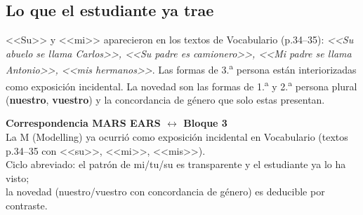 \documentclass[a4paper,10pt]{article}
\newcommand{\pos}[1]{\textbf{\textcolor{purpura}{#1}}}
\begin{document}

\subsection*{\textcolor{purpura}{Lo que el estudiante ya trae}}

<<Su>> y <<mi>> aparecieron en los textos de Vocabulario (p.34--35): \textit{<<Su abuelo se llama Carlos>>, <<Su padre es camionero>>, <<Mi padre se llama Antonio>>, <<mis hermanos>>}. Las formas de 3.\textsuperscript{a} persona est\'an interiorizadas como exposici\'on incidental. La novedad son las formas de 1.\textsuperscript{a} y 2.\textsuperscript{a} persona plural (\pos{nuestro}, \pos{vuestro}) y la concordancia de g\'enero que solo estas presentan.

\newpage


\begin{center}
{\Large\textbf{\textcolor{purpura}{Correspondencia MARS EARS $\leftrightarrow$ Bloque 3}}}\\[0.3cm]
{\small La M (Modelling) ya ocurri\'o como exposici\'on incidental en Vocabulario (textos p.34--35 con <<su>>, <<mi>>, <<mis>>).\\
Ciclo abreviado: el patr\'on de mi/tu/su es transparente y el estudiante ya lo ha visto;\\
la novedad (nuestro/vuestro con concordancia de g\'enero) es deducible por contraste.}
\end{center}

\vspace{0.5cm}
\end{document}
